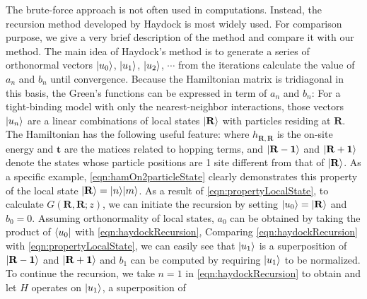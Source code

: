 The brute-force approach is not often used in computations. Instead, the recursion method developed by Haydock 
\cite{haydock1972, haydock1975} is most widely used. For comparison purpose, we give a very brief description of the
method and compare it with our method.  The main idea of Haydock's method is to generate a series of orthonormal
vectors $| u_0 \rangle$, $| u_1 \rangle$, $| u_2 \rangle$, $\cdots$ from the iterations
calculate the value of $a_n$ and $b_n$ until convergence. 
Because the Hamiltonian matrix is tridiagonal in this basis, the Green's functions can be expressed in 
term of $a_n$ and $b_n$:
For a tight-binding model with only the nearest-neighbor 
interactions, those vectors $| u_n \rangle$ are a linear combinations of local states $| \mathbf{R} \rangle$ with particles residing at 
$\mathbf{R}$. The Hamiltonian has the following useful feature:
where $h_{\mathbf{R}, \mathbf{R}}$ is the on-site energy and $\mathbf{t}$ are the matices related to hopping terms, and 
$|  \mathbf{R-1} \rangle$ and $|  \mathbf{R+1} \rangle$ denote the states whose particle 
positions are 1 site  different from that of $|  \mathbf{R} \rangle$. As a specific example, 
\autoref{eqn:hamOn2particleState} clearly demonstrates this property of the local state $|  \mathbf{R} \rangle = 
| n \rangle| m \rangle$. As a result of \autoref{eqn:propertyLocalState}, to calculate $G(\mathbf{R}, \mathbf{R}; z)$, 
we can initiate the recursion by setting $| u_0 \rangle = | \mathbf{R} \rangle$ and $b_0 = 0$. Assuming orthonormality of 
local states, $a_0$ can be obtained by taking the product of $\langle u_0 |$ with \autoref{eqn:haydockRecursion},
Comparing \autoref{eqn:haydockRecursion} with \autoref{eqn:propertyLocalState}, we can easily see that 
 $| u_1 \rangle$ is a superposition of $|  \mathbf{R-1} \rangle$ and $|  \mathbf{R+1} \rangle$ and $b_1$ can be 
computed by requiring $| u_1 \rangle$ to be normalized. To continue the recursion, we take
$n=1$ in \autoref{eqn:haydockRecursion} to obtain
and let $H$ operates on $| u_1 \rangle$, a superposition of  
